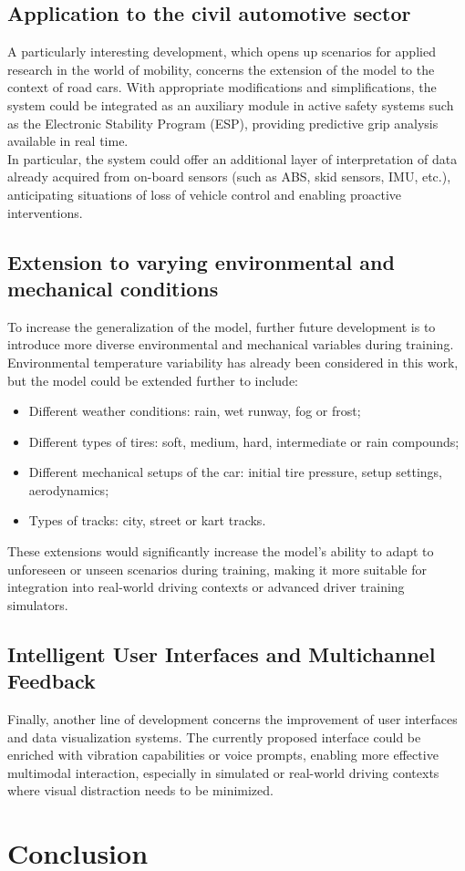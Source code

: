 \documentclass[a4paper,final,12pt]{report}
\begin{document}
\section{Application to the civil automotive sector}

A particularly interesting development, which opens up scenarios for applied research in the world of mobility, concerns the extension of the model to the context of road cars. With appropriate modifications and simplifications, the system could be integrated as an auxiliary module in active safety systems such as the Electronic Stability Program (ESP), providing predictive grip analysis available in real time.\\
In particular, the system could offer an additional layer of interpretation of data already acquired from on-board sensors (such as ABS, skid sensors, IMU, etc.), anticipating situations of loss of vehicle control and enabling proactive interventions.

\section{Extension to varying environmental and mechanical conditions}

To increase the generalization of the model, further future development is to introduce more diverse environmental and mechanical variables during training. Environmental temperature variability has already been considered in this work, but the model could be extended further to include:

\begin{itemize}
    \item Different weather conditions: rain, wet runway, fog or frost;
    \item Different types of tires: soft, medium, hard, intermediate or rain compounds;
    \item Different mechanical setups of the car: initial tire pressure, setup settings, aerodynamics;
    \item Types of tracks: city, street or kart tracks.
\end{itemize}

These extensions would significantly increase the model's ability to adapt to unforeseen or unseen scenarios during training, making it more suitable for integration into real-world driving contexts or advanced driver training simulators.

\section{Intelligent User Interfaces and Multichannel Feedback}
Finally, another line of development concerns the improvement of user interfaces and data visualization systems. The currently proposed interface could be enriched with vibration capabilities or voice prompts, enabling more effective multimodal interaction, especially in simulated or real-world driving contexts where visual distraction needs to be minimized.


\chapter{Conclusion}






\end{document}
